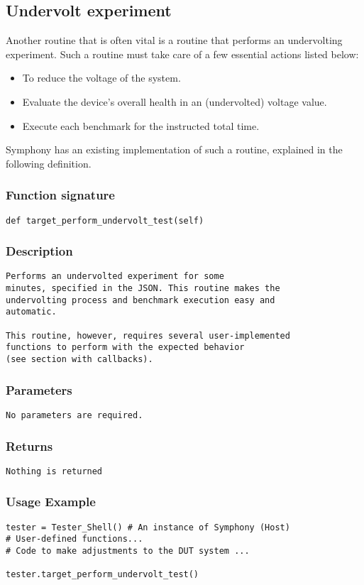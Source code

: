\subsection{Undervolt experiment}
Another routine that is often vital is a routine that performs an undervolting experiment. Such a routine must take care of a few essential actions listed below:
\begin{itemize}
  \item To reduce the voltage of the system.
  \item Evaluate the device's overall health in an (undervolted) voltage value.
  \item Execute each benchmark for the instructed total time.
\end{itemize}
Symphony has an existing implementation of such a routine, explained in the following definition.

\subsubsection{Function signature}
\begin{lstlisting}
def target_perform_undervolt_test(self)
\end{lstlisting}

\subsubsection{Description}
\begin{lstlisting}[mathescape=true, keywordstyle=\color{black}]
Performs an undervolted experiment for some
minutes, specified in the JSON. This routine makes the 
undervolting process and benchmark execution easy and 
automatic. 

This routine, however, requires several user-implemented 
functions to perform with the expected behavior 
(see section with callbacks). 
\end{lstlisting}

\subsubsection{Parameters}
\begin{lstlisting}[mathescape=true, keywordstyle=\color{black}]
No parameters are required.
\end{lstlisting}

\subsubsection{Returns}
\begin{lstlisting}[mathescape=true, keywordstyle=\color{black}]
Nothing is returned
\end{lstlisting}


\subsubsection{Usage Example}
\begin{lstlisting}
tester = Tester_Shell() # An instance of Symphony (Host)
# User-defined functions...
# Code to make adjustments to the DUT system ... 

tester.target_perform_undervolt_test()
\end{lstlisting}
